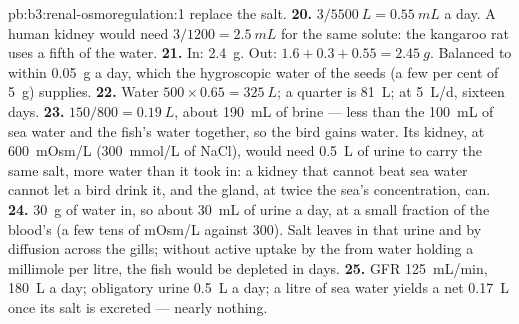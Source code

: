 \begin{solution}{pb:b3:renal-osmoregulation:1}
replace the salt.
\textbf{20.} $3/5500\ \unit{L} = \qty{0.55}{mL}$ a day. A human kidney
would need $3/1200 = \qty{2.5}{mL}$ for the same solute: the kangaroo
rat uses a fifth of the water.
\textbf{21.} In: \qty{2.4}{g}. Out: $1.6 + 0.3 + 0.55 = \qty{2.45}{g}$.
Balanced to within \qty{0.05}{g} a day, which the hygroscopic water of
the seeds (a few per cent of \qty{5}{g}) supplies.
\textbf{22.} Water $500\times 0.65 = \qty{325}{L}$; a quarter is
\qty{81}{L}; at \qty{5}{L/d}, sixteen days.
\textbf{23.} $150/800 = \qty{0.19}{L}$, about \qty{190}{mL} of brine
--- less than the \qty{100}{mL} of sea water and the fish's water
together, so the bird gains water. Its kidney, at \qty{600}{mOsm/L}
(\qty{300}{mmol/L} of NaCl), would need \qty{0.5}{L} of urine to carry
the same salt, more water than it took in: a kidney that cannot beat
sea water cannot let a bird drink it, and the gland, at twice the
sea's concentration, can.
\textbf{24.} \qty{30}{g} of water in, so about \qty{30}{mL} of urine a
day, at a small fraction of the blood's  (a few tens of
mOsm/L against \num{300}). Salt leaves in that urine and by diffusion
across the gills; without active uptake by the  from
water holding a millimole per litre, the fish would be depleted in
days.
\textbf{25.} GFR \qty{125}{mL/min}, \qty{180}{L} a day; obligatory
urine \qty{0.5}{L} a day; a litre of sea water yields a net
\qty{0.17}{L} once its salt is excreted --- nearly nothing.
\end{solution}
